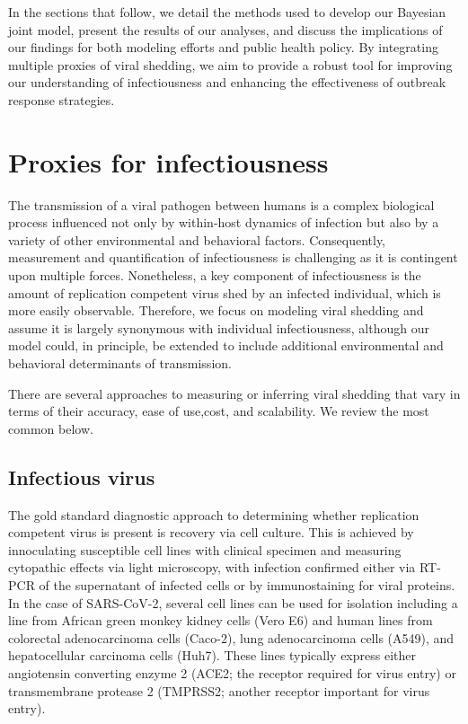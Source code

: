 \documentclass[12pt]{article}
\begin{document}
In the sections that follow, we detail the methods used to develop our Bayesian joint model, present the results of our analyses, and discuss the implications of our findings for both modeling efforts and public health policy. By integrating multiple proxies of viral shedding, we aim to provide a robust tool for improving our understanding of infectiousness and enhancing the effectiveness of outbreak response strategies.



\section{Proxies for infectiousness} \label{sec:proxies}
The transmission of a viral pathogen between humans is a complex biological process influenced not only by within-host dynamics of infection but also by a variety of other environmental and behavioral factors. Consequently, measurement and quantification of infectiousness is challenging as it is contingent upon multiple forces. Nonetheless, a key component of infectiousness is the amount of replication competent virus shed by an infected individual, which is more easily observable. Therefore, we focus on modeling viral shedding and assume it is largely synonymous with individual infectiousness, although our model could, in principle, be extended to include additional environmental and behavioral determinants of transmission.

There are several approaches to measuring or inferring viral shedding that vary in terms of their accuracy, ease of use,cost, and scalability. We review the most common below.

\subsection{Infectious virus}
The gold standard diagnostic approach to determining whether replication competent virus is present is recovery via cell culture. This is achieved by innoculating susceptible cell lines with clinical specimen and measuring cytopathic effects via light microscopy, with infection confirmed either via RT-PCR of the supernatant of infected cells or by immunostaining for viral proteins. In the case of SARS-CoV-2, several cell lines can be used for isolation including a line from African green monkey kidney cells (Vero E6) and human lines from colorectal adenocarcinoma cells (Caco-2), lung adenocarcinoma cells (A549), and hepatocellular carcinoma cells (Huh7). These lines typically express either angiotensin converting enzyme 2 (ACE2; the receptor required for virus entry) or transmembrane protease 2 (TMPRSS2; another receptor important for virus entry).
\end{document}
